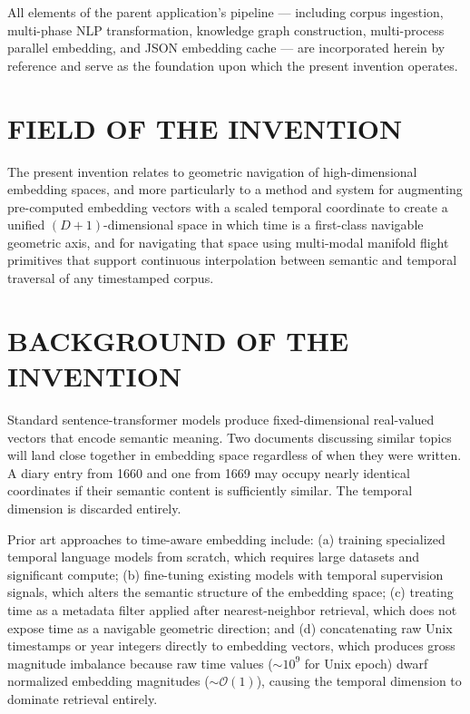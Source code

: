 \documentclass[12pt,letterpaper]{article}
\begin{document}
All elements of the parent application's pipeline --- including corpus ingestion,
multi-phase NLP transformation, knowledge graph construction, multi-process
parallel embedding, and JSON embedding cache --- are incorporated herein by
reference and serve as the foundation upon which the present invention operates.

\section*{FIELD OF THE INVENTION}

The present invention relates to geometric navigation of high-dimensional
embedding spaces, and more particularly to a method and system for augmenting
pre-computed embedding vectors with a scaled temporal coordinate to create a
unified $(D+1)$-dimensional space in which time is a first-class navigable
geometric axis, and for navigating that space using multi-modal manifold flight
primitives that support continuous interpolation between semantic and temporal
traversal of any timestamped corpus.

\section*{BACKGROUND OF THE INVENTION}

Standard sentence-transformer models produce fixed-dimensional real-valued
vectors that encode semantic meaning. Two documents discussing similar topics
will land close together in embedding space regardless of when they were
written. A diary entry from 1660 and one from 1669 may occupy nearly identical
coordinates if their semantic content is sufficiently similar. The temporal
dimension is discarded entirely.

Prior art approaches to time-aware embedding include: (a) training specialized
temporal language models from scratch, which requires large datasets and
significant compute; (b) fine-tuning existing models with temporal supervision
signals, which alters the semantic structure of the embedding space; (c)
treating time as a metadata filter applied after nearest-neighbor retrieval,
which does not expose time as a navigable geometric direction; and (d)
concatenating raw Unix timestamps or year integers directly to embedding
vectors, which produces gross magnitude imbalance because raw time values
($\sim 10^9$ for Unix epoch) dwarf normalized embedding magnitudes
($\sim \mathcal{O}(1)$), causing the temporal dimension to dominate retrieval
entirely.
\end{document}

